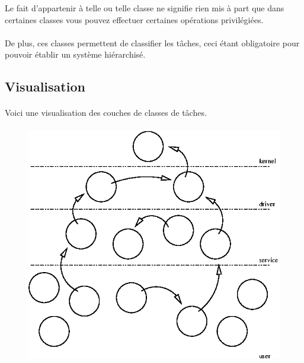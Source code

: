 \documentclass[10pt,a4wide]{article}
\begin{document}
Le fait d'appartenir \`a telle ou telle classe ne signifie rien mis \`a
part que dans certaines classes vous pouvez effectuer certaines op\'erations
privil\'egi\'ees.

\paragraph{}

De plus, ces classes permettent de classifier les t\^aches, ceci \'etant
obligatoire pour pouvoir \'etablir un syst\`eme hi\'erarchis\'e.

\subsection{Visualisation}

\paragraph{}

Voici une visualisation des couches de classes de t\^aches.

\paragraph{}

\begin{figure}[h]
\centerline{\includegraphics{figures/classes.eps}}
\end{figure}
\end{document}
